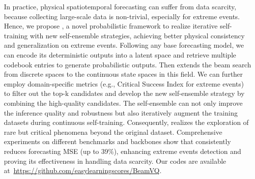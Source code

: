In practice,  physical spatiotemporal forecasting can suffer from data scarcity, because collecting large-scale data is non-trivial, especially for extreme events. 
Hence, we propose \method{}, a novel probabilistic framework to realize iterative self-training with new self-ensemble strategies, 
achieving better physical consistency and generalization on extreme events. 
Following any base forecasting model, 
we can encode its deterministic outputs into a latent space and retrieve multiple codebook entries to generate probabilistic outputs. 
Then \method{} extends the beam search from discrete spaces to the continuous state spaces in this field.
We can further employ domain-specific metrics (e.g., Critical Success Index for extreme events) to filter out the top-k candidates and develop the new self-ensemble strategy by combining the high-quality candidates. 
The self-ensemble can not only improve the inference quality and robustness but also iteratively augment the training datasets during continuous self-training. 
Consequently, \method{} realizes the exploration of rare but critical phenomena beyond the original dataset. 
Comprehensive experiments on different benchmarks and backbones show that \method{} consistently reduces forecasting MSE (up to 39\%), enhancing extreme events detection and proving its effectiveness in handling data scarcity. Our codes are available at~\url{https://github.com/easylearningscores/BeamVQ}.



